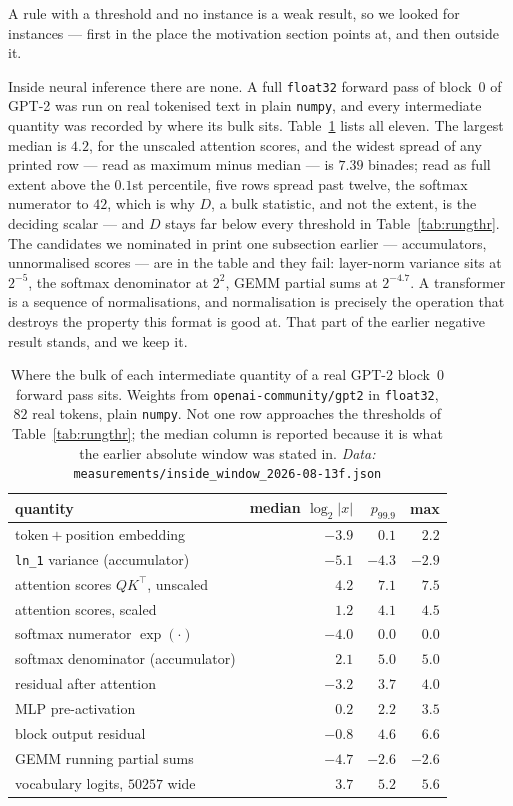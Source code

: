 \documentclass[11pt]{article}
\theoremstyle{definition}
\begin{document}
A rule with a threshold and no instance is a weak result, so we looked for
instances --- first in the place the motivation section points at, and then
outside it.

Inside neural inference there are none. A full \texttt{float32} forward pass of
block~$0$ of GPT-2 was run on real tokenised text in plain \texttt{numpy}, and
every intermediate quantity was recorded by where its bulk sits.
Table~\ref{tab:landing} lists all eleven. The largest median is $4.2$, for the
unscaled attention scores, and the widest spread of any printed row --- read
as maximum minus median --- is $7.39$ binades; read as full extent above the
$0.1$st percentile, five rows spread past twelve, the softmax numerator to
$42$, which is why $D$, a bulk statistic, and not the extent, is the deciding
scalar --- and $D$ stays far below every threshold in Table~\ref{tab:rungthr}. The
candidates we nominated in print one subsection earlier --- accumulators,
unnormalised scores --- are in the table and they fail: layer-norm variance sits
at $2^{-5}$, the softmax denominator at $2^{2}$, GEMM partial sums at
$2^{-4.7}$. A transformer is a sequence of normalisations, and normalisation is
precisely the operation that destroys the property this format is good at. That
part of the earlier negative result stands, and we keep it.

\begin{table}[htbp]\centering
\caption{Where the bulk of each intermediate quantity of a real GPT-2 block~$0$
forward pass sits. Weights from \texttt{openai-community/gpt2} in \texttt{float32},
$82$ real tokens, plain \texttt{numpy}. Not one row approaches the thresholds of
Table~\ref{tab:rungthr}; the median column is reported because it is what the
earlier absolute window was stated in. \emph{Data:} \texttt{measurements/inside\_window\_2026-08-13f.json}}
\label{tab:landing}
\begin{tabular}{lrrr}
\hline
quantity & median $\log_2|x|$ & $p_{99.9}$ & max \\
\hline
token${}+{}$position embedding & $-3.9$ & $0.1$ & $2.2$ \\
\texttt{ln\_1} variance (accumulator) & $-5.1$ & $-4.3$ & $-2.9$ \\
attention scores $QK^{\!\top}$, unscaled & $4.2$ & $7.1$ & $7.5$ \\
attention scores, scaled & $1.2$ & $4.1$ & $4.5$ \\
softmax numerator $\exp(\cdot)$ & $-4.0$ & $0.0$ & $0.0$ \\
softmax denominator (accumulator) & $2.1$ & $5.0$ & $5.0$ \\
residual after attention & $-3.2$ & $3.7$ & $4.0$ \\
MLP pre-activation & $0.2$ & $2.2$ & $3.5$ \\
block output residual & $-0.8$ & $4.6$ & $6.6$ \\
GEMM running partial sums & $-4.7$ & $-2.6$ & $-2.6$ \\
vocabulary logits, $50257$ wide & $3.7$ & $5.2$ & $5.6$ \\
\hline
\end{tabular}
\end{table}
\end{document}
